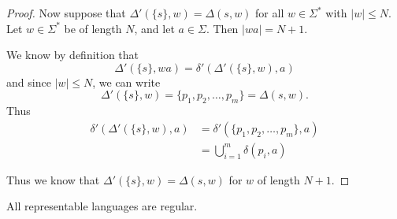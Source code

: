 \documentclass{bcthesis}
\begin{document}
\begin{proof}
		Now suppose that $\Delta'(\{ s \}, w) = \Delta(s, w)$ for all $w \in \Sigma^*$ with $|w| \leq N$.
		Let $w \in \Sigma^*$ be of length $N$, and let $a \in \Sigma$. 
		Then $|wa| = N + 1$.
		
		We know by definition that 
		\[
			\Delta'(\{ s\}, wa) = \delta'( \Delta'(\{ s\}, w), a )
		\]
		and since $|w| \leq N$, we can write 
		\[
			\Delta'(\{ s \}, w) = \{ p_1, p_2, \dots, p_m \} = \Delta(s, w).
		\]
		Thus
		\begin{align*}
			\delta'( \Delta'(\{ s \}, w), a ) &= \delta'(\{ p_1, p_2, \dots, p_m \}, a) \\
			&= \bigcup_{i=1}^m \delta(p_i, a)
		\end{align*}

		Thus we know that $\Delta'(\{ s \}, w) = \Delta(s, w)$ for $w$ of length $N+1$.

	\end{proof}

	\begin{claim}
	\label{prop:representable_languages_regular}
		All representable languages are regular.
	\end{claim}
\end{document}
